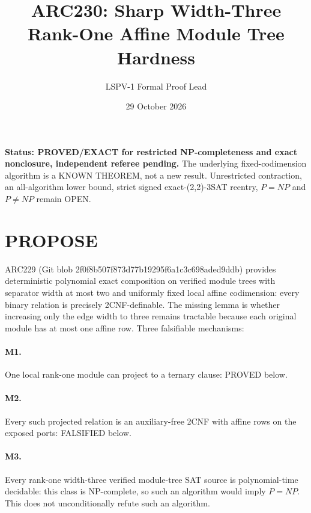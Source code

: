 \documentclass[11pt]{article}
\title{ARC230: Sharp Width-Three Rank-One Affine Module Tree Hardness}
\author{LSPV-1 Formal Proof Lead}
\date{29 October 2026}
\begin{document}
\maketitle
\noindent\textbf{Status: PROVED/EXACT for restricted NP-completeness and exact nonclosure, independent referee pending.} The underlying fixed-codimension algorithm is a KNOWN THEOREM, not a new result. Unrestricted contraction, an all-algorithm lower bound, strict signed exact-(2,2)-3SAT reentry, $P=NP$ and $P\ne NP$ remain OPEN.
\section{PROPOSE}
ARC229 (Git blob 2f0f8b507f873d77b19295f6a1c3c698aded9ddb) provides deterministic polynomial exact composition on verified module trees with separator width at most two and uniformly fixed local affine codimension: every binary relation is precisely 2CNF-definable. The missing lemma is whether increasing only the edge width to three remains tractable because each original module has at most one affine row. Three falsifiable mechanisms:
\paragraph{M1.} One local rank-one module can project to a ternary clause: PROVED below.
\paragraph{M2.} Every such projected relation is an auxiliary-free 2CNF with affine rows on the exposed ports: FALSIFIED below.
\paragraph{M3.} Every rank-one width-three verified module-tree SAT source is polynomial-time decidable: this class is NP-complete, so such an algorithm would imply $P=NP$. This does not unconditionally refute such an algorithm.
\end{document}
